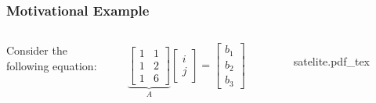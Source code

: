 \documentclass[aspectratio=169]{beamer}
\newcommand{\incfig}[2][1]{%
    \def\svgwidth{#1\columnwidth}
    {#2.pdf_tex} }
\begin{document}
\begin{frame} %
	\frametitle{Motivational Example}  %
	\begin{columns}


	Consider the following equation:

	\begin{equation*}
		\underbrace{\begin{bmatrix} 1 & 1 \\ 1 & 2 \\ 1 & 6 \end{bmatrix}}_A \begin{bmatrix} i \\ j  \end{bmatrix} = \begin{bmatrix} b_1 \\ b_2 \\ b_3\end{bmatrix}
	\end{equation*}

	\vspace*{10mm}
	

	\begin{figure}[ht]
    		\centering
	    \incfig{satelite}
	    \label{fig:satelite}
	\end{figure}
	\end{columns}


\end{frame}
\end{document}
